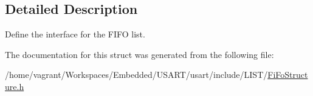 \subsection{Detailed Description}
Define the interface for the F\+I\+F\+O list. 

The documentation for this struct was generated from the following file\+:\begin{DoxyCompactItemize}
\item 
/home/vagrant/\+Workspaces/\+Embedded/\+U\+S\+A\+R\+T/usart/include/\+L\+I\+S\+T/\hyperlink{_fi_fo_structure_8h}{Fi\+Fo\+Structure.\+h}\end{DoxyCompactItemize}
